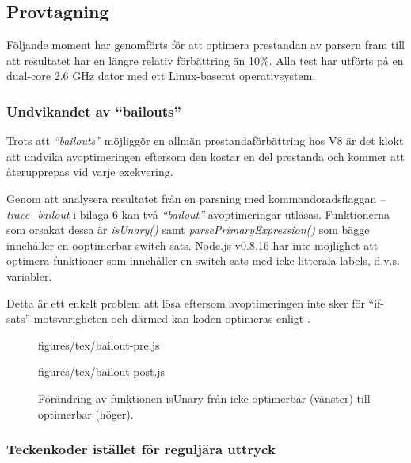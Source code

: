 \subsection{Provtagning}

Följande moment har genomförts för att optimera prestandan av parsern fram
till att resultatet har en längre relativ förbättring än 10\%. Alla test har
utförts på en dual-core 2.6 GHz dator med ett Linux-baserat operativsystem.

\subsubsection{Undvikandet av ``bailouts''}

Trots att \textit{``bailouts''} möjliggör en allmän prestandaförbättring hos
V8 är det klokt att undvika avoptimeringen eftersom den kostar en del
prestanda och kommer att återupprepas vid varje exekvering.

Genom att analysera resultatet från en parsning med kommandoradsflaggan
\textit{--trace_bailout} i bilaga 6 kan två
\textit{``bailout''}-avoptimeringar utläsas.  Funktionerna som orsakat dessa
är \textit{isUnary()} samt \textit{parsePrimaryExpression()} som bägge
innehåller en ooptimerbar switch-sats. \mbox{Node.js} v0.8.16 har inte
möjlighet att optimera funktioner som innehåller en switch-sats med
icke-litterala labels, d.v.s. variabler.

Detta är ett enkelt problem att lösa eftersom avoptimeringen inte sker för
``if-sats''-motsvarigheten och därmed kan koden optimeras enligt
.

\begin{figure}[ht]
  \begin{minipage}[t]{0.5\textwidth}
      {figures/tex/bailout-pre.js}
  \end{minipage}%
  \begin{minipage}[t]{0.5\textwidth}
      {figures/tex/bailout-post.js}
  \end{minipage}
  \caption{Förändring av funktionen isUnary från icke-optimerbar (vänster) till
    optimerbar (höger).}
  \label{fig:bailout}
\end{figure}

\subsubsection{Teckenkoder istället för reguljära uttryck}

